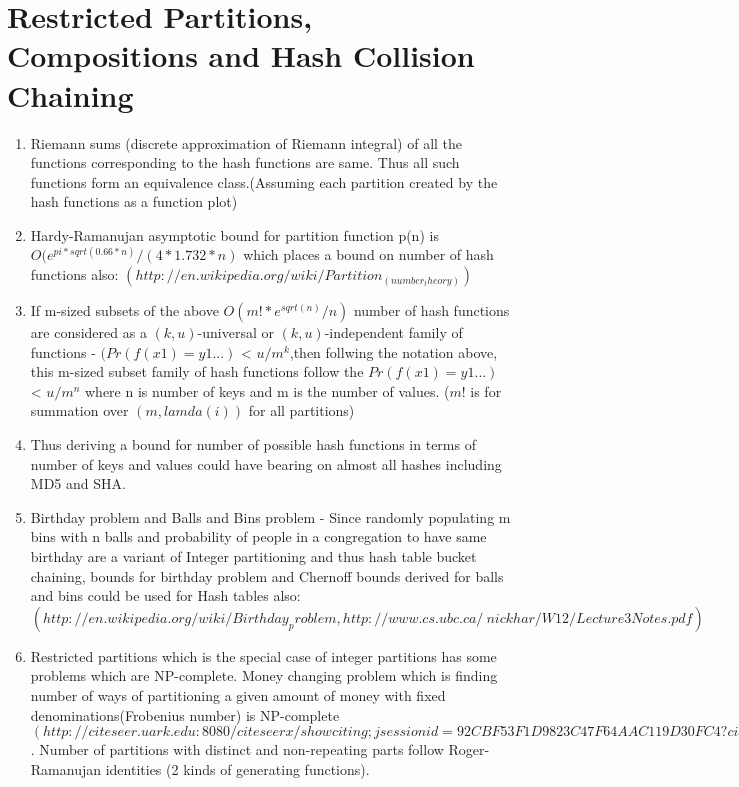 \documentclass[11pt,onecolumn]{article}
\begin{document}
\section{Restricted Partitions, Compositions and Hash Collision Chaining}
\begin{enumerate}
\item Riemann sums (discrete approximation of Riemann integral) of all the functions corresponding to the hash functions are same. Thus all such functions form an equivalence class.(Assuming each partition created by the hash functions as a function plot)

\item Hardy-Ramanujan asymptotic bound for partition function p(n) is ~ $O(e^{pi*sqrt(0.66*n)}/(4*1.732*n)$ which places a bound on 
number of hash functions also:
$(http://en.wikipedia.org/wiki/Partition_(number_theory))$

\item If m-sized subsets of the above $O(m!*e^{sqrt(n)}/n)$ number of 
hash functions are considered as a $(k,u)$-universal or $(k,u)$-independent 
family of functions - $(Pr(f(x1)=y1 ...)$ < $u/m^k$,then follwing the notation 
above, this m-sized subset family of hash functions follow the 
$Pr(f(x1)=y1 ...)$ < $u/m^n$ where n is number of keys and m is the number of values. 
($m!$ is for summation over $(m,lamda(i))$ for all partitions)

\item Thus deriving a bound for number of possible hash functions in terms of number of keys and values could have bearing on almost all hashes including MD5 and SHA.

\item Birthday problem and Balls and Bins problem - Since randomly populating 
m bins with n balls and probability of people in a congregation to have same 
birthday are a variant of Integer partitioning and thus hash table bucket chaining, 
bounds for birthday problem and Chernoff bounds derived for balls and bins 
could be used for Hash tables also: 
$(http://en.wikipedia.org/wiki/Birthday_problem, 
http://www.cs.ubc.ca/~nickhar/W12/Lecture3Notes.pdf)$

\item Restricted partitions which is the special case of integer partitions 
has some problems which are NP-complete. Money changing problem which is 
finding number of ways of partitioning a given amount of money with fixed 
denominations(Frobenius number) is NP-complete $(http://citeseer.uark.edu:8080/citeseerx/showciting;jsessionid=92CBF53F1D9823C47F64AAC119D30FC4?
cid=3509754, Naoki Abe 1987)$. Number of partitions with distinct 
and non-repeating parts follow Roger-Ramanujan identities 
(2 kinds of generating functions).


\end{enumerate}
\end{document}
